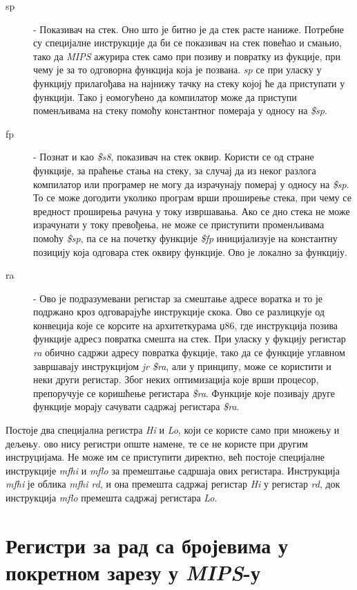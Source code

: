 \documentclass[12pt,oneside]{memoir}
\begin{document}
\begin{description}
  \item[sp] - Показивач на стек. Оно што је битно је да стек расте наниже. Потребне су специјалне инструкције да би се показивач на стек повећао и смањио, тако да \textit{MIPS} ажурира стек само при позиву и повратку из фукције, при чему је за то одговорна функција која је позвана. \textit{sp} се при уласку у функцију прилагођава на најнижу тачку на стеку којој ће да приступати у функцији. Тако ј еомогућено да компилатор може да приступи поменљивама на стеку помоћу константног помераја у односу на \textit{\$sp}.
  \item[fp] - Познат и као \textit{\$s8}, показивач на стек оквир. Користи се од стране функције, за праћење стања на стеку, за случај да из неког разлога компилатор или програмер не могу да израчунају померај у односу на \textit{\$sp}. То се може догодити уколико програм врши проширење стека, при чему се вредност проширења рачуна у току извршавања. Ако се дно стека не може израчунати у току превођења, не може се приступити променљивама помоћу \textit{\$sp}, па се на почетку функције \textit{\$fp} иницијализује на константну позицију која одговара стек оквиру функције. Ово је локално за функцију.
  \item[ra] - Ово је подразумевани регистар за смештање адресе воратка и то је подржано кроз одговарајуће инструкције скока. Ово се разлицкује од конвеција које се корсите на архитеткурама џ86, где инструкција позива функције адресз повратка смешта на стек. При уласку у фукцију регистар \textit{ra} обично садржи адресу повратка фукције, тако да се функције углавном завршавају инструкцијом \textit{jr \$ra}, али у принципу, може се користити и неки други регистар. Због неких оптимизација које врши процесор, препоручује се коришћење регистара \textit{\$ra}. Функције које позивају друге функције морају сачувати садржај регистара \textit{\$ra}.
\end{description}


\indent Постоје два специјална регистра \textit{Hi} и \textit{Lo}, који се користе само при множењу и дељењу. ово нису регистри опште намене, те се не користе при другим инструцијама. Не може им се приступити директно, већ постоје специјалне инструкције \textit{mfhi} и \textit{mflo} за премештање садршаја ових регистара. Инструкција \textit{mfhi} је облика \textit{mfhi rd}, и она премешта садржај регистар \textit{Hi} у регистар \textit{rd}, док инструкција \textit{mflo} премешта садржај регистара \textit{Lo}.


\section{Регистри за рад са бројевима у покретном зарезу у \textit{MIPS}-у}
\end{document}
